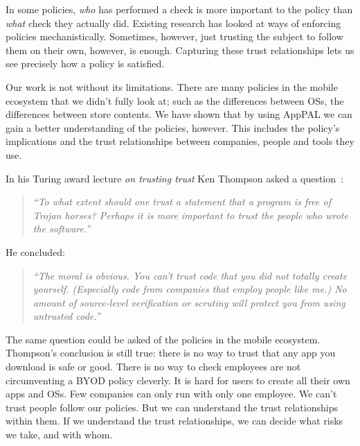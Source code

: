 \documentclass[thesis.tex]{subfiles}
\begin{document}
In some policies, \emph{who} has performed a check is more important
to the policy than \emph{what} check they actually did. Existing
research has looked at ways of enforcing policies
mechanistically. Sometimes, however, just trusting the subject to
follow them on their own, however, is enough.  Capturing these trust
relationships lets us see precisely how a policy is satisfied.

Our work is not without its limitations. There are many policies in the mobile
ecosystem that we didn't fully look at; such as the differences between OSs, the
differences between store contents. We have shown that by using AppPAL we can
gain a better understanding of the policies, however. This includes the policy's
implications and the trust relationships between companies, people and tools
they use.

\hspace{1em}

\noindent In his Turing award lecture \emph{on trusting trust} Ken Thompson asked a
question~\cite{ken_thompson_reflections_1984}:
\begin{quotation}\itshape\noindent
  ``To what extent should one trust a statement that a program is free of Trojan
  horses? Perhaps it is more important to trust the people who wrote the
  software.''
\end{quotation}
He concluded:
\begin{quotation}\itshape\noindent
  ``The moral is obvious. You can't trust code that you did not totally create
  yourself. (Especially code from companies that employ people like me.)
  No amount of source-level verification or scrutiny will protect you from using untrusted code.''
\end{quotation} 
The same question could be asked of the policies in the mobile
ecosystem. Thompson's conclusion is still true: there is no way to trust that
any app you download is safe or good. There is no way to check employees
are not circumventing a BYOD policy cleverly. It is hard
for users to create all their own apps and OSs. Few companies can only run
with only one employee. We can't trust people follow our policies. But we can
understand the trust relationships within them. If we understand the trust
relationships, we can decide what risks we take, and with whom.
\end{document}
